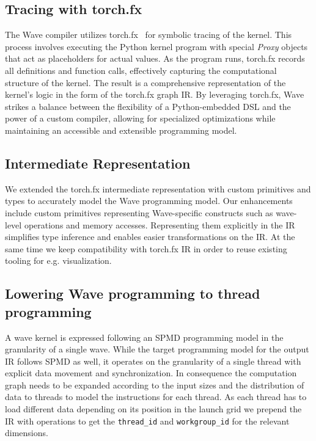 \documentclass{article}
\begin{document}
\subsection{Tracing with torch.fx}

The Wave compiler utilizes torch.fx~\cite{reed2022torch} for symbolic tracing of the kernel. This process involves executing the Python kernel program with special \emph{Proxy} objects that act as placeholders for actual values. As the program runs, torch.fx records all definitions and function calls, effectively capturing the computational structure of the kernel. The result is a comprehensive representation of the kernel's logic in the form of the torch.fx graph IR. By leveraging torch.fx, Wave strikes a balance between the flexibility of a Python-embedded DSL and the power of a custom compiler, allowing for specialized optimizations while maintaining an accessible and extensible programming model.

\subsection{Intermediate Representation}
We extended the torch.fx intermediate representation with custom primitives and types to accurately model the Wave programming model. Our enhancements include custom primitives representing Wave-specific constructs such as wave-level operations and memory accesses. Representing them explicitly in the IR simplifies type inference and enables easier transformations on the IR. At the same time we keep compatibility with torch.fx IR in order to reuse existing tooling for e.g. visualization.


\subsection{Lowering Wave programming to thread programming}
A wave kernel is expressed following an SPMD programming model in the granularity of a single wave. While the target programming model for the output IR follows SPMD as well, it operates on the granularity of a single thread with explicit data movement and synchronization.
In consequence the computation graph needs to be expanded according to the input sizes and the distribution of data to threads to model the instructions for each thread.
\smallskip
As each thread has to load different data depending on its position in the launch grid %
we prepend the IR with operations to get the \texttt{\footnotesize thread\_id} and \texttt{\footnotesize workgroup\_id} for the relevant dimensions.
\end{document}
